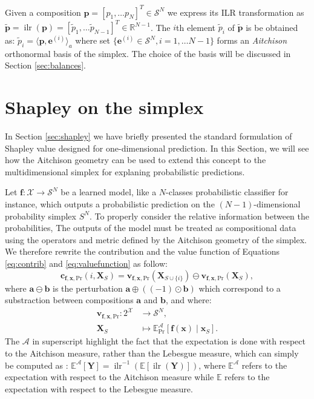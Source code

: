 \documentclass{article}
\theoremstyle{plain}
\theoremstyle{definition}
\theoremstyle{remark}
\DeclareMathOperator{\ilr}{ilr}
\begin{document}
Given a composition $\bm{p} = \left[ p_1,\dots p_N \right]^T \in \mathcal{S}^N$ we express its ILR transformation as $\tilde{\bm{p}} = \ilr \left( \bm{p} \right) = \left[ \tilde{p}_1,\dots \tilde{p}_{N-1} \right]^T \in \mathbb{R}^{N-1}$. The $i$th element $\tilde{p}_i$ of $\tilde{\bm{p}}$ is be obtained as: $\tilde{p}_i = \langle \bm{p}, \bm{e}^{(i)} \rangle_a$ where set $\{\bm{e}^{(i)} \in \mathcal{S}^N, i=1,\dots N-1\}$ forms an \emph{Aitchison} orthonormal basis of the simplex. The choice of the basis will be discussed in Section \ref{sec:balances}.


\section{Shapley on the simplex}

In Section \ref{sec:shapley} we have briefly presented the standard formulation of Shapley value designed for one-dimensional prediction. In this Section, we will see how the Aitchison geometry can be used to extend this concept to the multidimensional simplex for explaning probabilistic predictions.

Let $\bm{f}:\mathcal{X}\to\mathcal{S}^N$ be a learned model, like a $N$-classes probabilistic classifier for instance, which outputs a probabilistic prediction on the $(N-1)$-dimensional probability simplex $S^N$. To properly consider the relative information between the probabilities, The outputs of the model must be treated as compositional data using the operators and metric defined by the Aitchison geometry of the simplex. We therefore rewrite the contribution and the value function of Equations \ref{eq:contrib} and \ref{eq:valuefunction} as follow:
\begin{equation}
  \bm{c}_{\bm{f},\bm{x},\text{Pr}}(i,\bm{X}_S) = \bm{v}_{\bm{f},\bm{x},\text{Pr}}(\bm{X}_{S\cup\{i\}}) \ominus \bm{v}_{\bm{f},\bm{x},\text{Pr}}(\bm{X}_S),
\end{equation}
where $\bm{a}\ominus\bm{b}$ is the perturbation $\bm{a} \oplus \left( (-1)\odot \bm{b}\right)$ which correspond to a substraction between compositions $\bm{a}$ and $\bm{b}$, and where:
\begin{equation}
  \label{eq:valuefunctionsimplex}
  \begin{aligned}
    \bm{v}_{\bm{f},\bm{x},\text{Pr}}: 2^{\mathcal{X}} &\to \mathcal{S}^N,\\
    \bm{X}_S &\mapsto \mathbb{E}^{\mathcal{A}}_\text{Pr}[\bm{f}(\bm{x})\mid \bm{x}_S].
  \end{aligned}
\end{equation}
The $\mathcal{A}$ in superscript highlight the fact that the expectation is done with respect to the Aitchison measure, rather than the Lebesgue measure, which can simply be computed as \cite{pawlowskymodeling}: $\mathbb{E}^{\mathcal{A}}[\bm{Y}] = \ilr^{-1}\left( \mathbb{E} \left[ \ilr\left( \bm{Y} \right) \right] \right)$,
where $\mathbb{E}^{\mathcal{A}}$ refers to the expectation with respect to the Aitchison measure while $\mathbb{E}$ refers to the expectation with respect to the Lebesgue measure.
\end{document}
